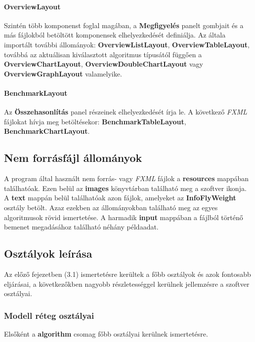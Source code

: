 \documentclass{elteikthesis}
\begin{document}
\paragraph{OverviewLayout}
Szintén több komponenst foglal magában, a \textbf{Megfigyelés} panelt gombjait és a más fájlokból betöltött komponensek elhelyezkedését definiálja. Az általa importált további állományok: \textbf{OverviewListLayout}, \textbf{OverviewTableLayout}, továbbá az aktuálisan kiválasztott algoritmus típusától függően a \textbf{OverviewChartLayout}, \textbf{OverviewDoubleChartLayout} vagy \textbf{OverviewGraphLayout} valamelyike.
\paragraph{BenchmarkLayout}
Az \textbf{Összehasonlítás} panel részeinek elhelyezkedését írja le. A következő \emph{FXML} fájlokat hívja meg betöltésekor: \textbf{BenchmarkTableLayout}, \textbf{BenchmarkChartLayout}.

\subsection{Nem forrásfájl állományok}
A program által használt nem forrás- vagy \emph{FXML} fájlok a \textbf{resources} mappában találhatóak. Ezen belül az \textbf{images} könyvtárban található meg a szoftver ikonja. A \textbf{text} mappán belül találhatóak azon fájlok, amelyeket az \textbf{InfoFlyWeight} osztály betölt. Azaz ezekben az állományokban található meg az egyes algoritmusok rövid ismertetése. A harmadik \textbf{input} mappában a fájlból történő bemenet megadásához található néhány példaadat.

\subsection{Osztályok leírása}
Az előző fejezetben (3.1) ismertetésre kerültek a főbb osztályok és azok fontosabb eljárásai, a következőkben nagyobb részletességgel kerülnek jellemzésre a szoftver osztályai.
\subsubsection{Modell réteg osztályai}
Elsőként a \textbf{algorithm} csomag főbb osztályai kerülnek ismertetésre.
\end{document}
